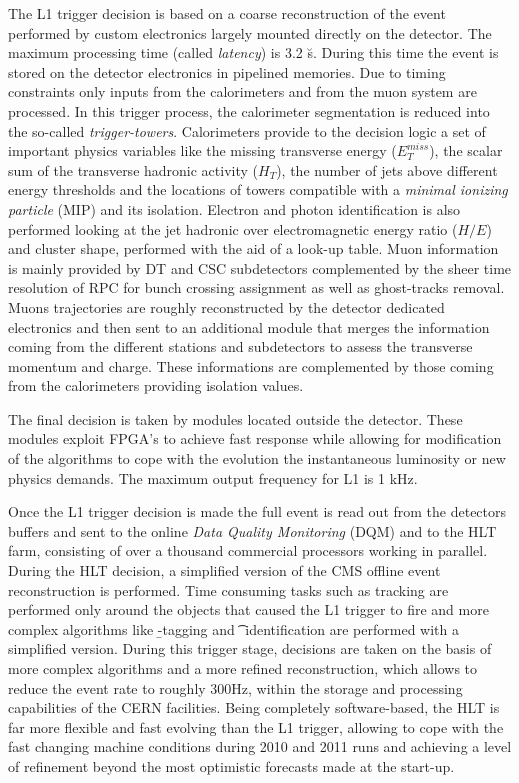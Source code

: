 The L1 trigger decision is based on a coarse reconstruction of the event performed by custom electronics largely mounted directly on the detector. The maximum processing time (called \emph{latency}) is 3.2 \u s. During this time the event is stored on the detector electronics in pipelined memories. Due to timing constraints only inputs from the calorimeters and from the muon system are processed. In this trigger process, the calorimeter segmentation is reduced into the so-called \emph{trigger-towers}. Calorimeters provide to the decision logic a set of important physics variables like the missing transverse energy ($E_T^{miss}$), the scalar sum of the transverse hadronic activity ($H_T$), the number of jets above different energy thresholds and the locations of towers compatible with a \emph{minimal ionizing particle} (MIP) and its isolation. Electron and photon identification is also performed looking at the jet hadronic over electromagnetic energy ratio ($H/E$) and cluster shape, performed with the aid of a look-up table. Muon information is mainly provided by DT and CSC subdetectors complemented by the sheer time resolution of RPC for bunch crossing assignment as well as ghost-tracks removal. Muons trajectories are roughly reconstructed by the detector dedicated electronics and then sent to an additional module that merges the information coming from the different stations and subdetectors to assess the transverse momentum  and charge. These informations are complemented by those coming from the calorimeters providing isolation values.

The final decision is taken by modules located outside the detector. These modules exploit FPGA's to achieve fast response while allowing for modification of the algorithms to cope with the evolution the instantaneous luminosity or new physics demands. The maximum output frequency for L1 is 1 kHz.

Once the L1 trigger decision is made the full event is read out from the detectors buffers and sent to the online \emph{Data Quality Monitoring} (DQM) and to the HLT farm, consisting of over a thousand commercial processors working in parallel. During the HLT decision, a simplified version of the CMS offline event reconstruction is performed. Time consuming tasks such as tracking are performed only around the objects that caused the L1 trigger to fire and more complex algorithms like \b-tagging and \t~identification are performed with a simplified version. During this trigger stage, decisions are taken on the basis of more complex algorithms and a more refined reconstruction, which allows to reduce the event rate to roughly 300Hz, within the storage and processing capabilities of the CERN facilities. Being completely software-based, the HLT is far more flexible and fast evolving than the L1 trigger, allowing to cope with the fast changing machine conditions during 2010 and 2011 runs and achieving a level of refinement beyond the most optimistic forecasts made at the start-up.

